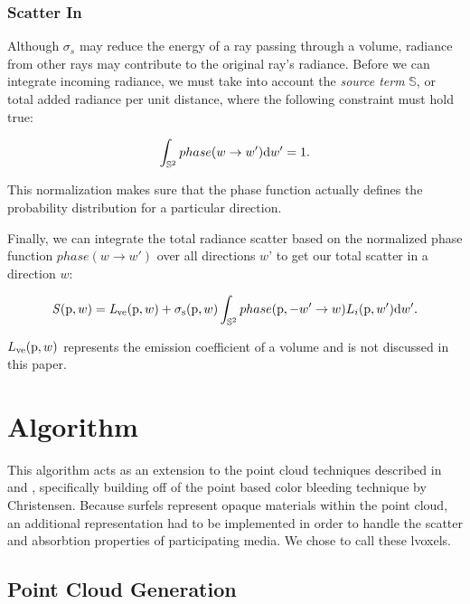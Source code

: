 \documentclass[runningheads]{llncs}
\begin{document}
\subsubsection{Scatter In}
Although $\sigma_{s}$ may reduce the energy of a ray passing through a volume, radiance from other rays may contribute to the original ray's radiance.  Before we can integrate incoming radiance, we must take into account the \textit{source term} $\mathbb{S}$, or total added radiance per unit distance, where the following constraint must hold true:

\begin{displaymath}
\int_{\mathbb{S}^2}phase(w \to w')\textup{d}w' = 1.
\end{displaymath}

This normalization makes sure that the phase function actually defines the probability distribution for a particular direction.

Finally, we can integrate the total radiance scatter based on the normalized phase function $phase(w \to w')$ over all directions $w$' to get our total scatter in a direction $w$:

\begin{displaymath}
\mathit{S}(\textup{p},w) = \mathit{L}_{\textup{ve}}(\textup{p},w) + \sigma_{\textup{s}}(\textup{p}, w) \int_{\mathbb{S}^2} phase(\textup{p}, -w' \to w) L_{i}(\textup{p},w')\textup{d}w'.
\end{displaymath}

$L_{\textup{ve}}(\textup{p}, w)$ represents the emission coefficient of a volume and is not discussed in this paper.



\section{Algorithm}
\label{algorithm_sec}
This algorithm acts as an extension to the point cloud techniques described in \cite{tabellion} and \cite{christensen:2008}, specifically building off of the point based color bleeding technique by Christensen.  Because surfels represent opaque materials within the point cloud, an additional representation had to be implemented in order to handle the scatter and absorbtion properties of participating media.  We chose to call these lvoxels.


\subsection{Point Cloud Generation}
\label{pointcloudgen}
\end{document}
